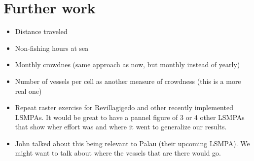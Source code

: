 \documentclass[11pt,english]{article}
\providecommand{\tightlist}{%
  \setlength{\itemsep}{0pt}\setlength{\parskip}{0pt}}
\begin{document}
\hypertarget{further-work}{%
\section{Further work}\label{further-work}}

\begin{itemize}
\tightlist
\item
  Distance traveled
\item
  Non-fishing hours at sea
\item
  Monthly crowdnes (same approach as now, but monthly instead of yearly)
\item
  Number of vessels per cell as another measure of crowdness (this is a
  more real one)
\item
  Repeat raster exercise for Revillagigedo and other recently
  implemented LSMPAs. It would be great to have a pannel figure of 3 or
  4 other LSMPAs that show wher effort was and where it went to
  generalize our results.
\item
  John talked about this being relevant to Palau (their upcoming LSMPA).
  We might want to talk about where the vessels that are there would go.
\end{itemize}



%
%
%


\end{document}
